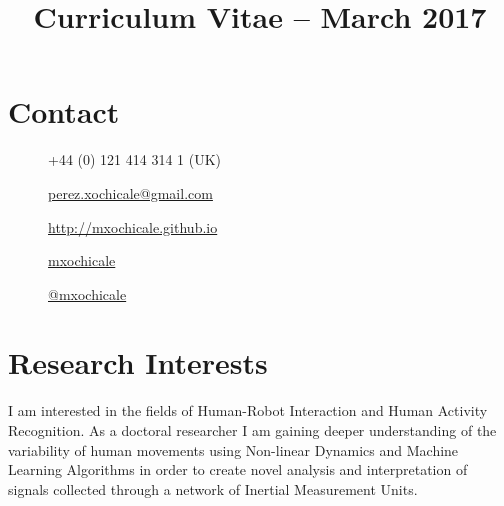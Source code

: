 \documentclass[10pt,a4paper,roman]{moderncv}
\title{Curriculum Vitae -- March 2017}
\begin{document}
%
%
\makecvtitle


\section{Contact}
%

\begin{changemargin}{2.4cm}{0.5cm}
  \begin{minipage}{.4\textwidth}
    \begin{description}
     \item [\faPhone ]    +44 (0) 121 414 314 1 (UK)
     \item[\faEnvelope]  \href{mailto:perez.xochicale@gmail.com}{perez.xochicale@gmail.com}
     \item[\faHome]  \href{http://mxochicale.github.io}{http://mxochicale.github.io}
     \end{description}
  \end{minipage}
  \begin{minipage}{.4\textwidth}
  \begin{description}
   \item[\faGithub]  \href{https://github.com/mxochicale}{mxochicale}
   \item[\faTwitter ] \href{https://twitter.com/_mxochicale}{@\textunderscore mxochicale}
   \end{description}
  \end{minipage}
\end{changemargin}



\section{Research Interests}
\begin{changemargin}{2.4cm}{0.5cm}
I am interested in the fields of Human-Robot Interaction and Human Activity Recognition.
As a doctoral researcher I am gaining deeper understanding of the variability
of human movements using Non-linear Dynamics and Machine Learning Algorithms
in order to create novel analysis and interpretation of signals
collected through a network of Inertial Measurement Units.
\end{changemargin}
\end{document}

